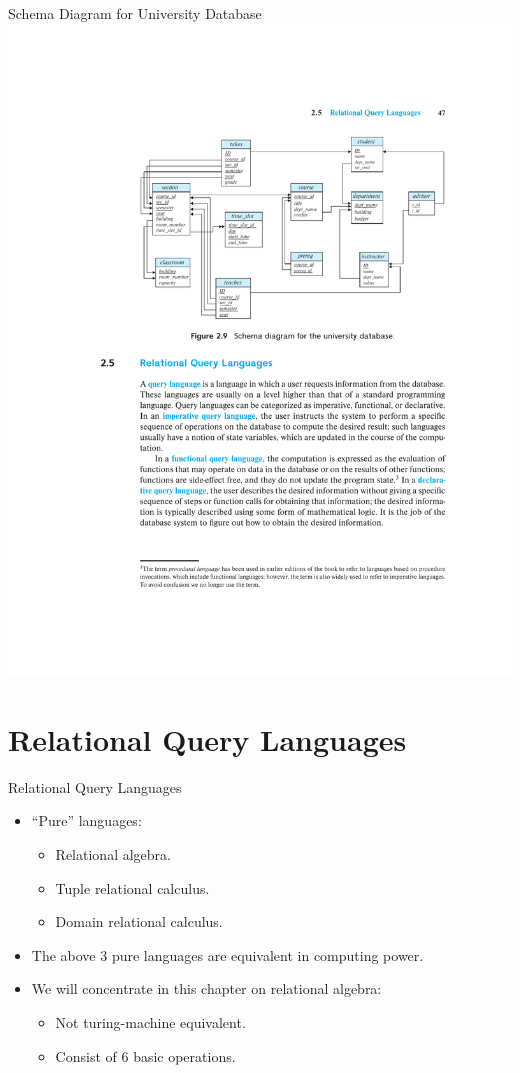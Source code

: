 \documentclass{beamer}
\begin{document}
\begin{frame}{Schema Diagram for University Database}
    \centering
    \includegraphics[width=\textwidth, trim={5.50cm 15.30cm 2.90cm 4.85cm}, clip]{figures/db_schema}
\end{frame}

\section{Relational Query Languages}

\begin{frame}{Relational Query Languages}
    \begin{itemize}
        \item ``Pure'' languages:
        \begin{itemize}
            \item Relational algebra.
            \item Tuple relational calculus.
            \item Domain relational calculus.
        \end{itemize}
        \item The above 3 pure languages are equivalent in computing power.
        \item We will concentrate in this chapter on relational algebra:
        \begin{itemize}
            \item Not turing-machine equivalent.
            \item Consist of 6 basic operations.
        \end{itemize}
    \end{itemize}
\end{frame}
\end{document}

